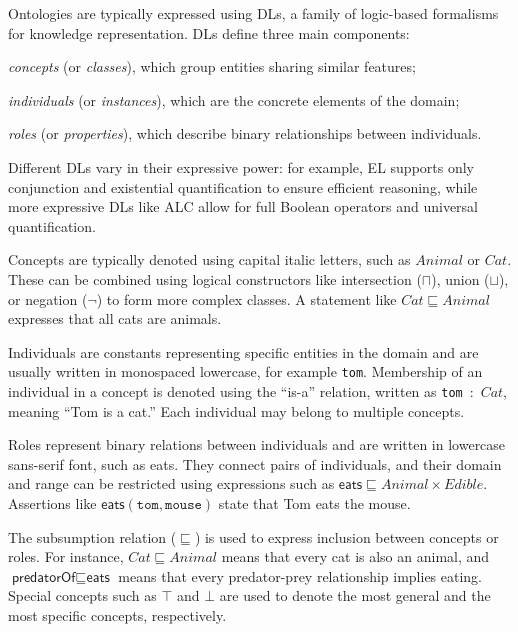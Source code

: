 Ontologies are typically expressed using \glspl{DL}, a family of logic-based formalisms for knowledge representation.
%
\Glspl{DL} define three main components:
%
\begin{inlinelist}
    \item\emph{concepts} (or \emph{classes}), which group entities sharing similar features;
    \item\emph{individuals} (or \emph{instances}), which are the concrete elements of the domain;
    \item\emph{roles} (or \emph{properties}), which describe binary relationships between individuals.
\end{inlinelist}
%
Different \glspl{DL} vary in their expressive power: for example, \gls{EL} supports only conjunction and existential quantification to ensure efficient reasoning, while more expressive DLs like \gls{ALC} allow for full Boolean operators and universal quantification.

Concepts are typically denoted using capital italic letters, such as $\mathit{Animal}$ or $\mathit{Cat}$.
%
These can be combined using logical constructors like intersection ($\sqcap$), union ($\sqcup$), or negation ($\lnot$) to form more complex classes.
%
A statement like $\mathit{Cat} \sqsubseteq \mathit{Animal}$ expresses that all cats are animals.

Individuals are constants representing specific entities in the domain and are usually written in monospaced lowercase, for example \texttt{tom}.
%
Membership of an individual in a concept is denoted using the ``is-a'' relation, written as \texttt{tom}~:~$\mathit{Cat}$, meaning ``Tom is a cat.''
%
Each individual may belong to multiple concepts.

Roles represent binary relations between individuals and are written in lowercase sans-serif font, such as \textsf{eats}.
%
They connect pairs of individuals, and their domain and range can be restricted using expressions such as $\textsf{eats} \sqsubseteq \mathit{Animal} \times \mathit{Edible}$.
%
Assertions like $\textsf{eats}(\texttt{tom}, \texttt{mouse})$ state that Tom eats the mouse.

The subsumption relation ($\sqsubseteq$) is used to express inclusion between concepts or roles.
%
For instance, $\mathit{Cat} \sqsubseteq \mathit{Animal}$ means that every cat is also an animal, and $\textsf{predatorOf} \sqsubseteq \textsf{eats}$ means that every predator-prey relationship implies eating.
%
Special concepts such as $\top$ and $\bot$ are used to denote the most general and the most specific concepts, respectively.

